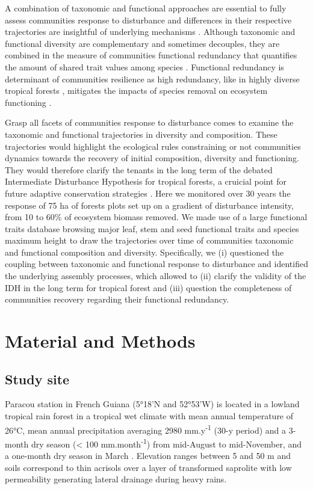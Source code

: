 \documentclass[fleqn,10pt]{ArtEcoFoG} %
\theoremstyle{definition}
\theoremstyle{definition}
\theoremstyle{definition}
\theoremstyle{remark}
\begin{document}
A combination of taxonomic and functional approaches are essential to
fully assess communities response to disturbance and differences in
their respective trajectories are insightful of underlying mechanisms
\citep{Lohbeck2015, Guariguata2001}. Although taxonomic and functional
diversity are complementary and sometimes decouples, they are combined
in the measure of communities functional redundancy that quantifies the
amount of shared trait values among species \citep{Carmona2016}.
Functional redundancy is determinant of communities resilience as high
redundancy, like in highly diverse tropical forests
\citep{Bellwood2006}, mitigates the impacts of species removal on
ecosystem functioning \citep{Trenbath1999, Elmqvist2003, Diaz2005}.

Grasp all facets of communities response to disturbance comes to examine
the taxonomic and functional trajectories in diversity and composition.
These trajectories would highlight the ecological rules constraining or
not communities dynamics towards the recovery of initial composition,
diversity and functioning. They would therefore clarify the tenants in
the long term of the debated Intermediate Disturbance Hypothesis for
tropical forests, a cruicial point for future adaptive conservation
strategies \citep{Adler2007}. Here we monitored over 30 years the
response of 75 ha of forests plots set up on a gradient of disturbance
intensity, from 10 to 60\% of ecosystem biomass removed. We made use of
a large functional traits database browsing major leaf, stem and seed
functional traits and species maximum height to draw the trajectories
over time of communities taxonomic and functional composition and
diversity. Specifically, we (i) questioned the coupling between
taxonomic and functional response to disturbance and identified the
underlying assembly processes, which allowed to (ii) clarify the
validity of the IDH in the long term for tropical forest and (iii)
question the completeness of communities recovery regarding their
functional redundancy.

\section{Material and Methods}\label{material-and-methods}

\subsection{Study site}\label{study-site}

Paracou station in French Guiana (5°18'N and 52°53'W) is located in a
lowland tropical rain forest in a tropical wet climate with mean annual
temperature of 26°C, mean annual precipitation averaging 2980
mm.y\textsuperscript{-1} (30-y period) and a 3-month dry season
(\textless{} 100 mm.month\textsuperscript{-1}) from mid-August to
mid-November, and a one-month dry season in March \citep{Wagner2011}.
Elevation ranges between 5 and 50 m and soils correspond to thin
acrisols over a layer of transformed saprolite with low permeability
generating lateral drainage during heavy rains.
\end{document}
